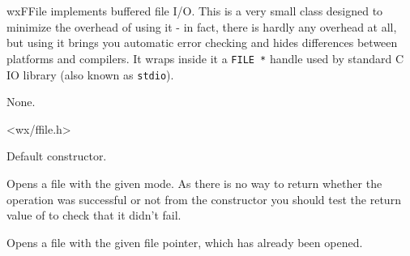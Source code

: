 
\section{}\label{wxffile}

wxFFile implements buffered file I/O. This is a very small class designed to
minimize the overhead of using it - in fact, there is hardly any overhead at
all, but using it brings you automatic error checking and hides differences
between platforms and compilers. It wraps inside it a {\tt FILE *} handle used
by standard C IO library (also known as {\tt stdio}).


None.


<wx/ffile.h>

\twocolwidtha{7cm}
\begin{twocollist}\itemsep=0pt%
\end{twocollist}



\label{wxffilector}


Default constructor.


Opens a file with the given mode. As there is no way to return whether the
operation was successful or not from the constructor you should test the
return value of  to check that it didn't
fail.


Opens a file with the given file pointer, which has already been opened.


